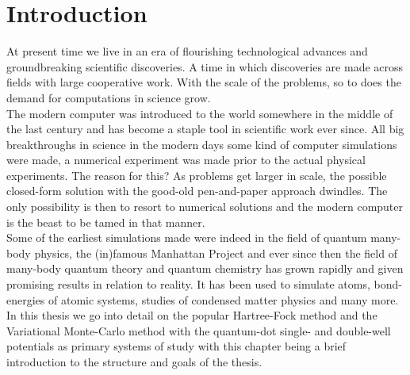 \chapter{Introduction\label{chapter:1}}
    At present time we live in an era of flourishing technological advances and
    groundbreaking scientific discoveries. A time in which discoveries are made
    across fields with large cooperative work. With the scale of the problems,
    so to does the demand for computations in science grow. \\
    The modern computer was introduced to the world somewhere in the middle of
    the last century and has become a staple tool in scientific work ever
    since. All big breakthroughs in science in the modern days some kind of
    computer simulations were made, a numerical experiment was made prior to
    the actual physical experiments. The reason for this? As problems get
    larger in scale, the possible closed-form solution with the good-old
    pen-and-paper approach dwindles. The only possibility is then to resort to
    numerical solutions and the modern computer is the beast to be tamed in
    that manner. \\
    Some of the earliest simulations made were indeed in the field of quantum
    many-body physics, the (in)famous Manhattan Project and ever since then the
    field of many-body quantum theory and quantum chemistry has grown rapidly
    and given promising results in relation to reality. It has been used to
    simulate atoms, bond-energies of atomic systems, studies of condensed
    matter physics and many more. In this thesis we go into detail on the
    popular Hartree-Fock method and the Variational Monte-Carlo method with the
    quantum-dot single- and double-well potentials as primary systems of study
    with this chapter being a brief introduction to the structure and goals of
    the thesis.


